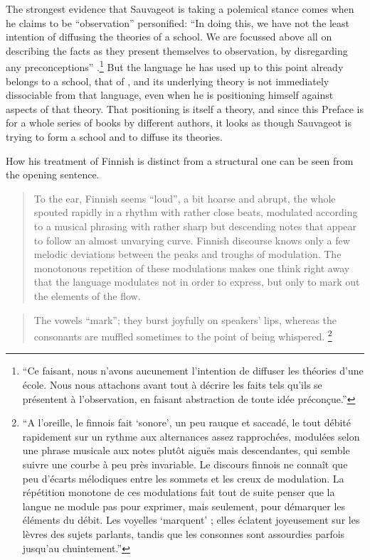 \documentclass[output=paper]{langscibook}
\begin{document}
The strongest evidence that Sauvageot is taking a polemical stance comes when he claims to be ``observation'' personified: ``In doing this, we have not the least intention of diffusing the theories of a school. We are focussed above all on describing the facts as they present themselves to observation, by disregarding any preconceptions'' \citep[7--8]{Sauvageot1946}.\footnote{``Ce faisant, nous n'avons aucunement l'intention de diffuser les théories d'une école. Nous nous attachons avant tout à décrire les faits tels qu'ils se présentent à l'observation, en faisant abstraction de toute idée préconçue.''} But the language he has used up to this point already belongs to a school, that of , and its underlying theory is not immediately dissociable from that language, even when he is positioning himself against aspects of that theory. That positioning is itself a theory, and since this Preface is for a whole series of books by different authors, it looks as though Sauvageot is trying to form a school and to diffuse its theories.

How his treatment of Finnish is distinct from a structural one can be seen from the opening sentence. 

\begin{quotation}
To the ear, Finnish seems ``loud'', a bit hoarse and abrupt, the whole spouted rapidly in a rhythm with rather close beats, modulated according to a musical phrasing with rather sharp but descending notes that appear to follow an almost unvarying curve. Finnish discourse knows only a few melodic deviations between the peaks and troughs of modulation. The monotonous repetition of these modulations makes one think right away that the language modulates not in order to express, but only to mark out the elements of the flow.
\end{quotation}

\begin{quotation}
The vowels ``mark''; they burst joyfully on speakers' lips, whereas the consonants are muffled sometimes to the point of being whispered. \citep[15]{Sauvageot1946}\footnote{``A l'oreille, le finnois fait `sonore', un peu rauque et saccadé, le tout débité rapidement sur un rythme aux alternances assez rapprochées, modulées selon une phrase musicale aux notes plutôt aiguës mais descendantes, qui semble suivre une courbe à peu près invariable. Le discours finnois ne connaît que peu d'écarts mélodiques entre les sommets et les creux de modulation. La répétition monotone de ces modulations fait tout de suite penser que la langue ne module pas pour exprimer, mais seulement, pour démarquer les éléments du débit. Les voyelles `marquent' ; elles éclatent joyeusement sur les lèvres des sujets parlants, tandis que les consonnes sont assourdies parfois jusqu'au chuintement.''}
\end{quotation}
\end{document}
